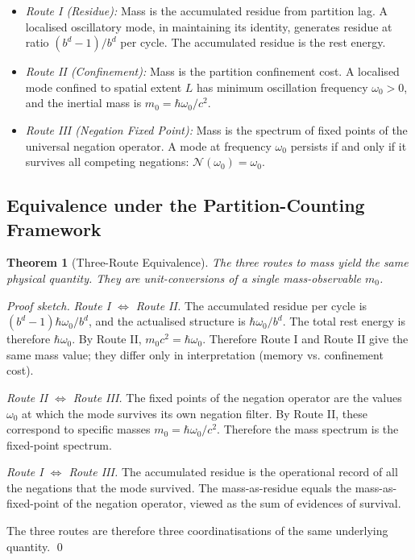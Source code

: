 \documentclass[twocolumn,10pt,a4paper]{article}
\newtheorem{theorem}{Theorem}[section]
\theoremstyle{definition}
\theoremstyle{remark}
\newcommand{\Negation}{\mathcal{N}}
\begin{document}
\begin{itemize}[leftmargin=1.2em,itemsep=0.3em]
    \item \emph{Route I (Residue):} Mass is the accumulated residue from partition lag. A localised oscillatory mode, in maintaining its identity, generates residue at ratio $(b^d - 1)/b^d$ per cycle. The accumulated residue is the rest energy.

    \item \emph{Route II (Confinement):} Mass is the partition confinement cost. A localised mode confined to spatial extent $L$ has minimum oscillation frequency $\omega_0 > 0$, and the inertial mass is $m_0 = \hbar\omega_0/c^2$.

    \item \emph{Route III (Negation Fixed Point):} Mass is the spectrum of fixed points of the universal negation operator. A mode at frequency $\omega_0$ persists if and only if it survives all competing negations: $\Negation(\omega_0) = \omega_0$.
\end{itemize}

\subsection{Equivalence under the Partition-Counting Framework}

\begin{theorem}[Three-Route Equivalence]
\label{thm:three-routes}
The three routes to mass yield the same physical quantity. They are unit-conversions of a single mass-observable $m_0$.
\end{theorem}

\begin{proof}[Proof sketch]
\emph{Route I $\Leftrightarrow$ Route II.} The accumulated residue per cycle is $(b^d - 1)\hbar\omega_0/b^d$, and the actualised structure is $\hbar\omega_0/b^d$. The total rest energy is therefore $\hbar\omega_0$. By Route II, $m_0 c^2 = \hbar\omega_0$. Therefore Route I and Route II give the same mass value; they differ only in interpretation (memory vs. confinement cost).

\emph{Route II $\Leftrightarrow$ Route III.} The fixed points of the negation operator are the values $\omega_0$ at which the mode survives its own negation filter. By Route II, these correspond to specific masses $m_0 = \hbar\omega_0/c^2$. Therefore the mass spectrum is the fixed-point spectrum.

\emph{Route I $\Leftrightarrow$ Route III.} The accumulated residue is the operational record of all the negations that the mode survived. The mass-as-residue equals the mass-as-fixed-point of the negation operator, viewed as the sum of evidences of survival.

The three routes are therefore three coordinatisations of the same underlying quantity. \qed
\end{proof}
\end{document}

